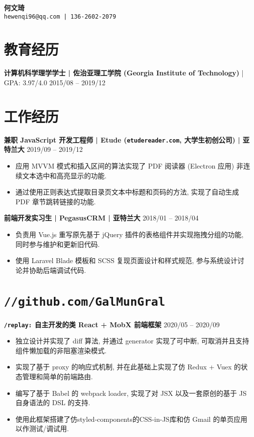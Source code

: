 \documentclass[10 pt]{article}
\begin{document}
\begin{center}
\textbf{\huge 何文琦}\\
\vspace{1em}
\texttt{hewenqi96@qq.com | 136-2602-2079 }
\end{center}

\section*{教育经历}
\textbf{计算机科学理学学士 | 佐治亚理工学院 (Georgia Institute of Technology)} | GPA: 3.97/4.0 \hfill 2015/08 -- 2019/12

\section*{工作经历}
\textbf{兼职 JavaScript 开发工程师 | Etude (\texttt{etudereader.com}, 大学生初创公司) | 亚特兰大} \hfill 2019/09 -- 2019/12
\begin{itemize}
\item 应用 MVVM 模式和插入区间的算法实现了 PDF 阅读器 (Electron 应用) 非连续文本选中和高亮显示的功能.
\item 通过使用正则表达式提取目录页文本中标题和页码的方法, 实现了自动生成 PDF 章节跳转链接的功能.
\end{itemize}

\textbf{前端开发实习生 | PegasusCRM | 亚特兰大} \hfill 2018/01 -- 2018/04
\begin{itemize}
\item 负责用 Vue.js 重写原先基于 jQuery 插件的表格组件并实现拖拽分组的功能, 同时参与维护和更新旧代码.
\item 使用 Laravel Blade 模板和 SCSS 复现页面设计和样式规范, 参与系统设计讨论并协助后端调试代码.
\end{itemize} 


\section*{\texttt{\large //github.com/GalMunGral}}
\textbf{ \texttt{/replay:} 自主开发的类 React + MobX  前端框架} \hfill 2020/05 -- 2020/09
\begin{itemize}
\item 独立设计并实现了 diff 算法, 并通过 generator 实现了可中断, 可取消并且支持组件懒加载的非阻塞渲染模式.
\item 实现了基于 proxy 的响应式机制, 并在此基础上实现了仿 Redux + Vuex 的状态管理和简单的前端路由.
\item 编写了基于 Babel 的 webpack loader, 实现了对 JSX 以及一套原创的基于 JS 自身语法的 DSL 的支持.
\item 使用此框架搭建了仿styled-components的CSS-in-JS库和仿 Gmail 的单页应用以作测试/调试用.
\end{itemize}
\end{document}
